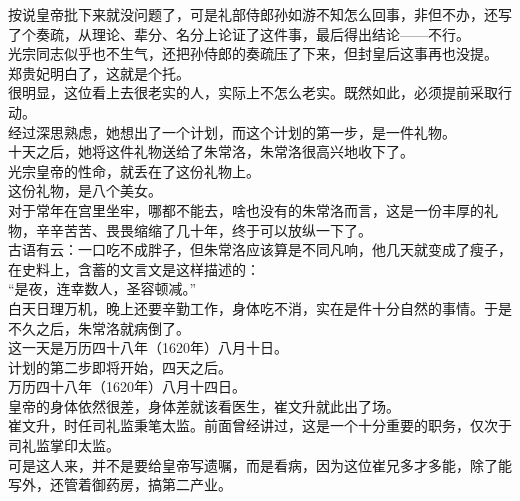\begin{multicols}{\theparacolNo}
按说皇帝批下来就没问题了，可是礼部侍郎孙如游不知怎么回事，非但不办，还写了个奏疏，从理论、辈分、名分上论证了这件事，最后得出结论——不行。\\

光宗同志似乎也不生气，还把孙侍郎的奏疏压了下来，但封皇后这事再也没提。\\

郑贵妃明白了，这就是个托。\\

很明显，这位看上去很老实的人，实际上不怎么老实。既然如此，必须提前采取行动。\\

经过深思熟虑，她想出了一个计划，而这个计划的第一步，是一件礼物。\\

十天之后，她将这件礼物送给了朱常洛，朱常洛很高兴地收下了。\\

光宗皇帝的性命，就丢在了这份礼物上。\\

这份礼物，是八个美女。\\

对于常年在宫里坐牢，哪都不能去，啥也没有的朱常洛而言，这是一份丰厚的礼物，辛辛苦苦、畏畏缩缩了几十年，终于可以放纵一下了。\\

古语有云：一口吃不成胖子，但朱常洛应该算是不同凡响，他几天就变成了瘦子，在史料上，含蓄的文言文是这样描述的：\\

“是夜，连幸数人，圣容顿减。”\\

白天日理万机，晚上还要辛勤工作，身体吃不消，实在是件十分自然的事情。于是不久之后，朱常洛就病倒了。\\

这一天是万历四十八年（1620年）八月十日。\\

计划的第二步即将开始，四天之后。\\

万历四十八年（1620年）八月十四日。\\

皇帝的身体依然很差，身体差就该看医生，崔文升就此出了场。\\

崔文升，时任司礼监秉笔太监。前面曾经讲过，这是一个十分重要的职务，仅次于司礼监掌印太监。\\

可是这人来，并不是要给皇帝写遗嘱，而是看病，因为这位崔兄多才多能，除了能写外，还管着御药房，搞第二产业。\\


\end{multicols}
